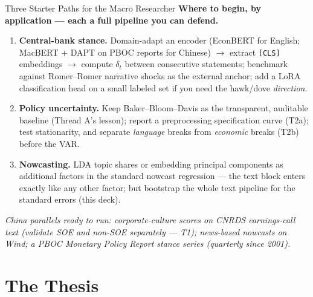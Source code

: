 \begin{frame}{Three Starter Paths for the Macro Researcher}
\textbf{Where to begin, by application --- each a full pipeline you can defend.}
\begin{enumerate}
\item \textbf{Central-bank stance.} Domain-adapt an encoder (EconBERT for English; MacBERT $+$ DAPT on PBOC reports for Chinese) $\to$ extract \texttt{[CLS]} embeddings $\to$ compute $\delta_t$ between consecutive statements; benchmark against Romer--Romer narrative shocks as the external anchor; add a LoRA classification head on a small labeled set if you need the hawk/dove \emph{direction}.
\medskip
\item \textbf{Policy uncertainty.} Keep Baker--Bloom--Davis as the transparent, auditable baseline (Thread A's lesson); report a preprocessing specification curve (T2a); test stationarity, and separate \emph{language} breaks from \emph{economic} breaks (T2b) before the VAR.
\medskip
\item \textbf{Nowcasting.} LDA topic shares or embedding principal components as additional factors in the standard nowcast regression --- the text block enters exactly like any other factor; but bootstrap the whole text pipeline for the standard errors (this deck).
\end{enumerate}
\medskip
\textit{\footnotesize China parallels ready to run: corporate-culture scores on CNRDS earnings-call text (validate SOE and non-SOE separately --- T1); news-based nowcasts on Wind; a PBOC Monetary Policy Report stance series (quarterly since 2001).}
\end{frame}

\section{The Thesis}

